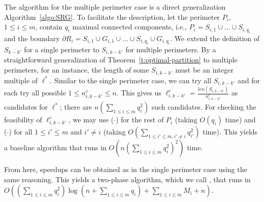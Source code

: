 The algorithm for the multiple perimeter case is a direct 
generalization Algorithm~\ref{algo:SRG}. To facilitate the description, 
let the perimeter $P_i$, $1 \le i \le m$, contain $q_i$ maximal connected 
components, i.e., $P_i = S_{i,1} \cup\ldots \cup S_{i,q_i}$ and the 
boundary $\partial R_i = S_{i,1} \cup G_{i,1} \cup \ldots \cup S_{i,q_i} 
\cup G_{i,q_i}$. We extend the definition of $S_{k-k'}$ for a single 
perimeter to $S_{i,k-k'}$ for multiple perimeters. By a straightforward 
generalization of Theorem~\ref{t:optimal-partition} to multiple perimeters,
for an \opg instance, the length of some $S_{i,k-k'}$ must be an integer 
multiple of $\ell^*$. Similar to the single perimeter case, we can try 
all $S_{i,k-k'}$ and for each try all possible $1 \le n_{i,k-k'}^c \le n$. 
This gives us $\ell_{i,k-k'}^c = \frac{len(S_{i,k-k'})}{n_{i,k-k'}^c}$ as 
candidates for $\ell^*$; there are $n(\sum_{1\le i \le m} q_i^2)$ such 
candidates. For checking the feasibility of $\ell_{i,k-k'}^c$, we may use 
\isLFeasibleByTilingPartial($\cdot$) for the rest of $P_i$ (taking $O(q_i)$ 
time) and \isLFeasibleByTilingFull($\cdot$) for all $1 \le i' \le m$ and $i' 
\ne i$ (taking $O(\sum_{1 \le i' \le m, i' \ne i} q_{i'}^2)$ time). 
This yields a baseline algorithm that runs in 
$O(n(\sum_{1\le i \le m} q_i^2)^2)$ time. 

From here, speedups can be obtained as in the single perimeter case using 
the same reasoning. This yields a two-phase algorithm, which we call 
\algoMRG, that runs in $O((\sum_{1\le i \le m} q_i^2) \log(n + 
\sum_{1\le i \le m} q_i) + \sum_{1\le i \le m} M_i + n)$. 

